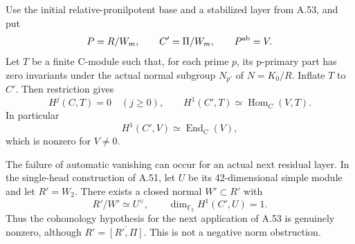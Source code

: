 Use the initial relative-pronilpotent base and a
stabilized layer from A.53, and put
\[
 P=R/W_m,\qquad C'=\Pi/W_m,
 \qquad P^{\rm ab}=V.
\]
Let \(T\) be a finite C-module such that, for
each prime \(p\), its p-primary part has zero
invariants under the actual normal subgroup
\(N_{p'}\) of \(N=K_0/R\).
Inflate \(T\) to \(C'\). Then restriction gives
\[
 H^j(C,T)=0\quad(j\geq0),\qquad
 H^1(C',T)\simeq\operatorname{Hom}_C(V,T).
                                                               \tag{A.54.1}
\]
In particular
\[
                        H^1(C',V)\simeq\operatorname{End}_C(V),
                                                               \tag{A.54.2}
\]
which is nonzero for \(V\ne0\).

The failure of automatic vanishing can occur
for an actual next residual layer. In the
single-head construction of A.51, let \(U\)
be its 42-dimensional simple module and let
\(R'=W_2\). There exists a closed normal
\(W'\subset R'\) with
\[
 R'/W'\simeq U^\vee,
 \qquad \dim_{\mathbb F_2}H^1(C',U)=1.
                                                               \tag{A.54.3}
\]
Thus the cohomology hypothesis for the next
application of A.53 is genuinely nonzero,
although \(R'=\overline{[R',\Pi]}\).
This is not a negative norm obstruction.

